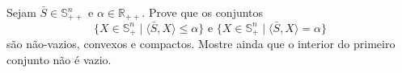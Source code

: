


\renewcommand{\|}[1]{\mathbb{#1}}
\renewcommand{\"}[1]{\ensuremath{\mathcal{#1}}}

\newcommand{\sse}{\Leftrightarrow}
\newcommand{\se}{\Rightarrow}
\newcommand{\so}{\Leftarrow}

\newcommand{\eigen}{\lambda^{\downarrow}}
\newcommand{\Tr}{\textrm{Tr}}






\begin{homeworkProblem}[]
Sejam $\bar{S} \in \|{S}_{++}^n$ e $\alpha \in \|{R}_{++}$. Prove que os conjuntos
$$\{X \in \|{S}_{+}^{n} \mid \langle \bar{S}, X \rangle \leq \alpha \} \text{ e } 
  \{X \in \|{S}_{+}^{n} \mid \langle \bar{S}, X \rangle = \alpha \}$$
são não-vazios, convexos e compactos. Mostre ainda que o interior do primeiro conjunto não é vazio.
\end{homeworkProblem}


